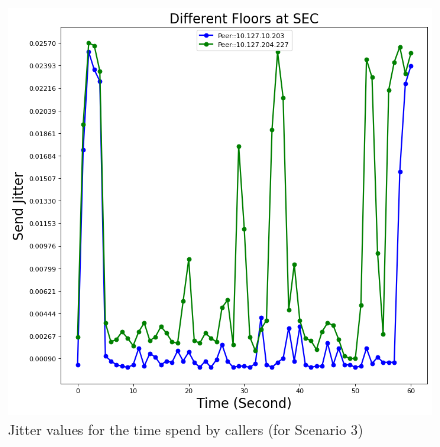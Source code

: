 	\begin{figure}[!b]
		\begin{minipage}{\textwidth}
			\includegraphics[scale=0.38]{Images/experiment/senarios/df_diff_floor.png}
		\end{minipage}
		\caption{Jitter values for the time spend by callers (for Scenario 3)}
		\label{fig:scene-out-3}
	\end{figure}


